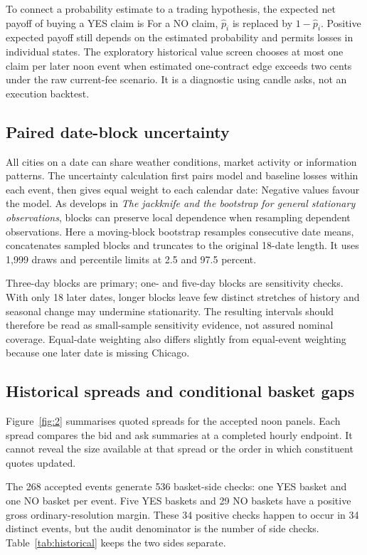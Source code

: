 To connect a probability estimate to a trading hypothesis, the expected net payoff of buying a YES claim is
For a NO claim, $\widehat p_i$ is replaced by $1-\widehat p_i$. Positive expected payoff still depends on the estimated probability and permits losses in individual states. The exploratory historical value screen chooses at most one claim per later noon event when estimated one-contract edge exceeds two cents under the raw current-fee scenario. It is a diagnostic using candle asks, not an execution backtest.

\subsection{Paired date-block uncertainty}
All cities on a date can share weather conditions, market activity or information patterns. The uncertainty calculation first pairs model and baseline losses within each event, then gives equal weight to each calendar date:
Negative values favour the model. As  develops in \textit{The jackknife and the bootstrap for general stationary observations}, blocks can preserve local dependence when resampling dependent observations. Here a moving-block bootstrap resamples consecutive date means, concatenates sampled blocks and truncates to the original 18-date length. It uses 1,999 draws and percentile limits at 2.5 and 97.5 percent.

Three-day blocks are primary; one- and five-day blocks are sensitivity checks. With only 18 later dates, longer blocks leave few distinct stretches of history and seasonal change may undermine stationarity. The resulting intervals should therefore be read as small-sample sensitivity evidence, not assured nominal coverage. Equal-date weighting also differs slightly from equal-event weighting because one later date is missing Chicago.

\label{sec:results}
\subsection{Historical spreads and conditional basket gaps}
Figure~\ref{fig:2} summarises quoted spreads for the accepted noon panels. Each spread compares the bid and ask summaries at a completed hourly endpoint. It cannot reveal the size available at that spread or the order in which constituent quotes updated.


The 268 accepted events generate 536 basket-side checks: one YES basket and one NO basket per event. Five YES baskets and 29 NO baskets have a positive gross ordinary-resolution margin. These 34 positive checks happen to occur in 34 distinct events, but the audit denominator is the number of side checks. Table~\ref{tab:historical} keeps the two sides separate.

